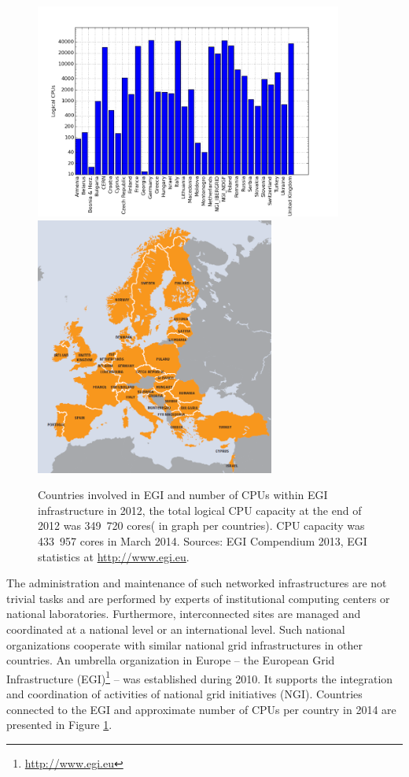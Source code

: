 \begin{figure}[htb]
    \centering
    \includegraphics[width=0.9\textwidth]{chapter2/egicpus.png}
    \includegraphics[width=0.7\textwidth]{chapter2/egi.png}
    \caption{Countries involved in EGI and number of CPUs within EGI infrastructure in 2012, the total logical CPU capacity at the end of 2012 was 349~720 cores( in graph per countries). CPU capacity was 433~957 cores in March 2014. Sources: EGI Compendium 2013, EGI statistics at \url{http://www.egi.eu}.%
    }
    \label{fig:egi}
\end{figure}
The administration and maintenance of such networked infrastructures are not trivial tasks and are performed by experts of institutional computing centers or national laboratories. Furthermore, interconnected sites are managed and coordinated at a national level or an international level. Such national organizations cooperate with similar national grid infrastructures in other countries. An umbrella organization in Europe -- the European Grid Infrastructure (EGI)\footnote{\url{http://www.egi.eu}} -- was established during 2010. It supports the integration and coordination of activities of national grid initiatives (NGI). Countries connected to the EGI and approximate number of CPUs per country in 2014 are presented in Figure \ref{fig:egi}.

